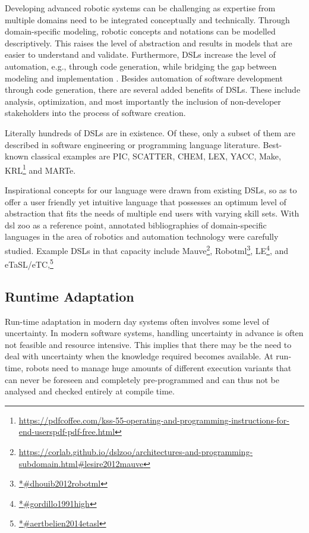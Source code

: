 \documentclass[conference]{IEEEtran}
\newcommand{\foot}[1]{\footnote{\url{#1}}}
\begin{document}
Developing advanced robotic systems can be challenging as expertise from multiple domains need to be integrated conceptually and technically. Through domain-speciﬁc modeling, robotic concepts and notations can be modelled descriptively. This raises the level of abstraction and results in models that are easier to understand and validate. Furthermore, DSLs increase the level of automation, e.g., through code generation, while bridging the gap between modeling and implementation \cite{dsl-robo}. Besides automation of software development through code generation, there are several added benefits of DSLs. These include analysis, optimization, and most importantly the inclusion of non-developer stakeholders into the process of software creation.

Literally hundreds of DSLs are in existence. Of these, only a subset of them are described in software engineering or programming language literature. Best-known classical examples are PIC, SCATTER, CHEM, LEX, YACC, Make, KRL\foot{https://pdfcoffee.com/kss-55-operating-and-programming-instructions-for-end-userspdf-pdf-free.html} and MARTe.

Inspirational concepts for our language were drawn from existing DSLs, so as to offer a user friendly yet intuitive language that possesses an optimum level of abstraction that fits the needs of multiple end users with varying skill sets. With dsl zoo \cite{dsl-robo} as a reference point, annotated bibliographies of domain-specific languages in the area of robotics and automation technology were carefully studied. Example DSLs in that capacity include Mauve\foot{https://corlab.github.io/dslzoo/architectures-and-programming-subdomain.html#lesire2012mauve}, Robotml\foot{*#dhouib2012robotml}, LE\foot{*#gordillo1991high}, and eTaSL/eTC,\foot{*#aertbelien2014etasl} 

\subsection{Runtime Adaptation}
Run-time adaptation in modern day systems often involves some level of uncertainty. In modern software systems, handling uncertainty in advance is often not feasible and resource intensive. This implies that there may be the need to deal with uncertainty when the knowledge required becomes available. At run-time, robots need to manage huge amounts of different execution variants that can never be foreseen and completely pre-programmed and can thus not be analysed and checked entirely at compile time.
\end{document}
